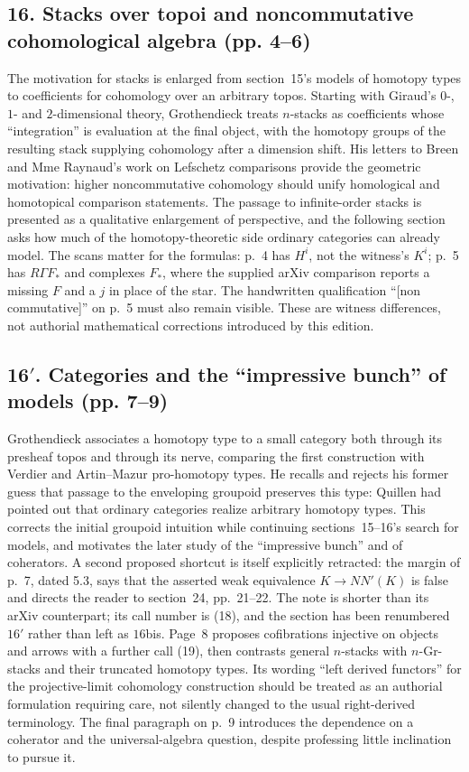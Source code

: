 \subsection*{16. Stacks over topoi and noncommutative cohomological algebra (pp. 4--6)}
The motivation for stacks is enlarged from section~15's models of homotopy types to coefficients for cohomology over an arbitrary topos. Starting with Giraud's $0$-, $1$- and $2$-dimensional theory, Grothendieck treats $n$-stacks as coefficients whose ``integration'' is evaluation at the final object, with the homotopy groups of the resulting stack supplying cohomology after a dimension shift. His letters to Breen and Mme Raynaud's work on Lefschetz comparisons provide the geometric motivation: higher noncommutative cohomology should unify homological and homotopical comparison statements. The passage to infinite-order stacks is presented as a qualitative enlargement of perspective, and the following section asks how much of the homotopy-theoretic side ordinary categories can already model. The scans matter for the formulas: p.~4 has $H^i$, not the witness's $K^i$; p.~5 has $R\Gamma F_*$ and complexes $F_*$, where the supplied arXiv comparison reports a missing $F$ and a $j$ in place of the star. The handwritten qualification ``[non commutative]'' on p.~5 must also remain visible. These are witness differences, not authorial mathematical corrections introduced by this edition.

\subsection*{16$'$. Categories and the ``impressive bunch'' of models (pp. 7--9)}
Grothendieck associates a homotopy type to a small category both through its presheaf topos and through its nerve, comparing the first construction with Verdier and Artin--Mazur pro-homotopy types. He recalls and rejects his former guess that passage to the enveloping groupoid preserves this type: Quillen had pointed out that ordinary categories realize arbitrary homotopy types. This corrects the initial groupoid intuition while continuing sections~15--16's search for models, and motivates the later study of the ``impressive bunch'' and of coherators. A second proposed shortcut is itself explicitly retracted: the margin of p.~7, dated 5.3, says that the asserted weak equivalence $K\longrightarrow NN'(K)$ is false and directs the reader to section~24, pp.~21--22. The note is shorter than its arXiv counterpart; its call number is (18), and the section has been renumbered $16'$ rather than left as $16$bis. Page~8 proposes cofibrations injective on objects and arrows with a further call (19), then contrasts general $n$-stacks with $n$-Gr-stacks and their truncated homotopy types. Its wording ``left derived functors'' for the projective-limit cohomology construction should be treated as an authorial formulation requiring care, not silently changed to the usual right-derived terminology. The final paragraph on p.~9 introduces the dependence on a coherator and the universal-algebra question, despite professing little inclination to pursue it.

